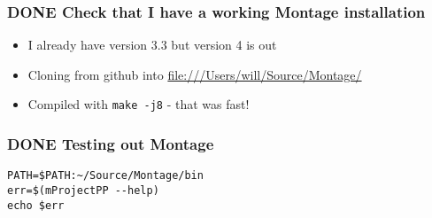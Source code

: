 \documentclass[11pt]{article}
\begin{document}
\subsubsection{{\bfseries\sffamily DONE} Check that I have a working Montage installation}
\label{sec:orgheadline34}
\begin{itemize}
\item I already have version 3.3 but version 4 is out
\item Cloning from github into \url{file:///Users/will/Source/Montage/}
\item Compiled with \texttt{make -j8} - that was fast!
\end{itemize}
\subsubsection{{\bfseries\sffamily DONE} Testing out Montage}
\label{sec:orgheadline35}
\begin{verbatim}
PATH=$PATH:~/Source/Montage/bin
err=$(mProjectPP --help)
echo $err
\end{verbatim}
\end{document}
